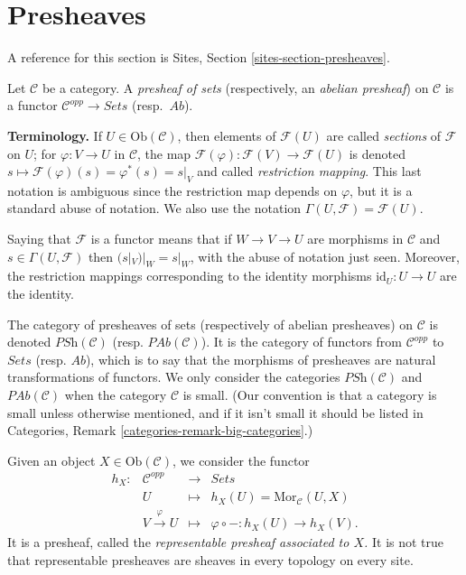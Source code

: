 \section{Presheaves}
\label{section-presheaves}

\noindent
A reference for this section is
Sites, Section \ref{sites-section-presheaves}.

\begin{definition}
\label{definition-presheaf}
Let $\mathcal{C}$ be a category. A {\it presheaf of sets} (respectively, an
{\it abelian presheaf}) on $\mathcal{C}$ is a functor $\mathcal{C}^{opp} \to
\textit{Sets}$ (resp.\ $\textit{Ab}$).
\end{definition}

\noindent
{\bf Terminology.} If $U \in \text{Ob}(\mathcal{C})$, then elements of
$\mathcal{F}(U)$ are called {\it sections} of $\mathcal{F}$ on
$U$; for $\varphi: V \to U$ in $\mathcal{C}$, the
map $\mathcal{F}(\varphi) : \mathcal{F}(V) \to
\mathcal{F}(U)$ is denoted $s \mapsto \mathcal{F}(\varphi) (s) =
\varphi^* (s) = s |_V $ and called {\it restriction mapping}. This
last notation is ambiguous since the restriction map depends on $\varphi$, but
it is a standard abuse of notation. We also use the notation
$\Gamma(U, \mathcal{F}) = \mathcal{F}(U)$.

\medskip\noindent
Saying that $\mathcal{F}$ is a functor means that if
$W \to V \to U$ are morphisms in $\mathcal{C}$ and
$s \in \Gamma(U,\mathcal{F})$ then
$(s|_V)|_W = s |_W$, with the abuse of
notation just seen. Moreover, the restriction mappings corresponding to
the identity morphisms $\text{id}_U : U \to U$ are the identity.

\medskip\noindent
The category of presheaves of sets (respectively of abelian presheaves) on
$\mathcal{C}$ is denoted $\textit{PSh} (\mathcal{C})$ (resp. $\textit{PAb}
(\mathcal{C})$). It is the category of functors from $\mathcal{C}^{opp}$ to
$\textit{Sets}$ (resp. $\textit{Ab}$), which is to say that the morphisms of
presheaves are natural transformations of functors. We only consider the
categories $\textit{PSh}(\mathcal{C})$ and $\textit{PAb}(\mathcal{C})$
when the category $\mathcal{C}$ is small. (Our convention is that a category
is small unless otherwise mentioned, and if it isn't small it should be
listed in Categories, Remark \ref{categories-remark-big-categories}.)

\begin{example}
\label{example-representable-presheaf}
Given an object $X \in \text{Ob}(\mathcal{C})$, we consider the functor
$$
\begin{matrix}
h_X : & \mathcal{C}^{opp} & \longrightarrow & \textit{Sets} \\
& U & \longmapsto & h_X(U) = \text{Mor}_\mathcal{C}(U,X) \\
& V \xrightarrow{\varphi} U & \longmapsto &
\varphi \circ - : h_X(U) \to h_X(V).
\end{matrix}
$$
It is a presheaf, called the {\it representable presheaf associated to $X$.}
It is not true that representable presheaves are sheaves in every topology on
every site.
\end{example}

